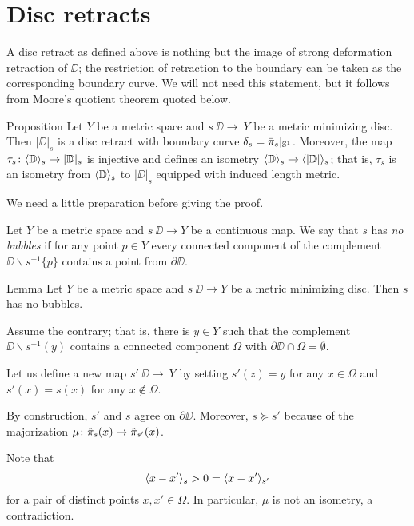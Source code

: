 \section{Disc retracts}\label{Metric minimizing discs}

A disc retract as defined above is nothing but the image of strong deformation retraction of $\DD$;
the restriction of retraction to the boundary can be taken as the corresponding boundary curve.
We will not need this statement, but it follows from Moore's quotient theorem quoted below. 

\begin{thm}{Proposition}\label{prop:|D|}
Let $Y$ be a metric space and $s\:\DD\to\ Y$ be a metric minimizing disc.
Then $|\DD|_s$ is a disc retract with boundary curve $\delta_s=\bar\pi_s|_{\mathbb{S}^1}$.
Moreover, the map $\tau_s\colon\langle\mathbb{D}\rangle_s\to |\mathbb{D}|_s$ is injective and defines an isometry
$\<\DD\>_s\zz\to \<|\DD|\>_s$;
that is, $\tau_s$ is an isometry from $\langle\mathbb{D}\rangle_s$ to $|\DD|_s$ equipped with induced length metric.
\end{thm}

We need a little preparation before giving the proof.

Let $Y$ be a metric space and
$s\:\DD\to Y$ be a continuous map.
We say that $s$ has \label{page:no-bubble}\emph{no bubbles}
if for any point $p\in Y$ every connected component of the complement $\DD\backslash s^{-1}\{p\}$ contains a point from $\partial \DD$.

\begin{thm}{Lemma}\label{prop:point-complement}
Let $Y$ be a metric space and $s\:\DD\to Y$ be a metric minimizing disc.
Then $s$ has no bubbles.
\end{thm}

Assume the contrary;
that is, there is $y\in Y$ such that the complement $\DD\backslash s^{-1}(y)$ contains a connected component $\Omega$ with $\partial \DD\cap \Omega=\emptyset$.

Let us define a new map $s'\:\DD\to\ Y$ by setting $s'(z)=y$ for any $x\in \Omega$ and $s'(x)=s(x)$ for any $x\notin \Omega$.

By construction, $s'$ and $s$ agree on $\partial\DD$. Moreover, $s\succcurlyeq s'$
because of the majorization $\mu\:\hat\pi_s(x)\zz\mapsto \hat\pi_{s'}(x)$.

Note that
\[\langle x-x'\rangle_{s}>0=\langle x-x'\rangle_{s'}\]
for a pair of distinct points $x,x'\in \Omega$.
In particular, $\mu$ is not an isometry, a contradiction.
\qeds



